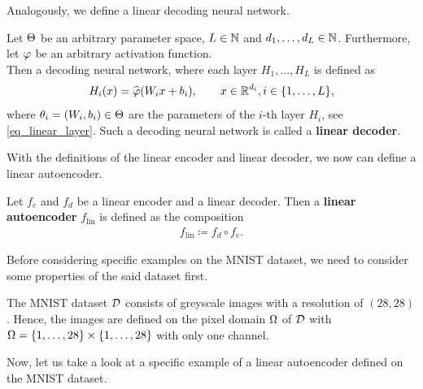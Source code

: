 Analogously, we define a linear decoding neural network.

\begin{definition}\label{def_linear_decoder}
Let $\operatorname{\Theta}$ be an arbitrary parameter space, $L\in \operatorname{\mathbb{N}}$ and $d_1,\ldots,d_L \in \operatorname{\mathbb{N}}$. Furthermore, let $\operatorname{\varphi}$ be an arbitrary activation function.\\
Then a decoding neural network, where each layer $H_1,\ldots, H_L$ is defined as
\begin{align*}
H_i(x) = \widehat{\operatorname{\varphi}}(W_ix + b_i), \qquad x \in \operatorname{\mathbb{R}}^{d_i}, i \in \{1,\ldots, L\},
\end{align*}
where $\theta_i=(W_i, b_i)\in\operatorname{\Theta}$ are the parameters of the $i$-th layer $H_i$, see \eqref{eq_linear_layer}. Such a decoding neural network is called a \textbf{linear decoder}.
\end{definition}


With the definitions of the linear encoder and linear decoder, we now can define a linear autoencoder.


\begin{definition}
Let $f_e$ and $f_d$ be a linear encoder and a linear decoder. Then a \textbf{linear autoencoder} $f_{\text{lin}}$ is defined as the composition
\begin{align*}
f_{\text{lin}} \coloneqq f_d \circ f_e.
\end{align*}
\end{definition}

Before considering specific examples on the MNIST dataset, we need to consider some properties of the said dataset first.

\begin{proposition}\label{def:mnist}
The MNIST dataset $\operatorname{\mathcal{D}}$ consists of greyscale images with a resolution of $(28,28)$. Hence, the images are defined on the pixel domain $\Omega$ of $\operatorname{\mathcal{D}}$ with $\Omega=\{1,\ldots,28\}\times\{1,\ldots,28\}$ with only one channel.
\end{proposition}

Now, let us take a look at a specific example of a linear autoencoder defined on the MNIST dataset.

